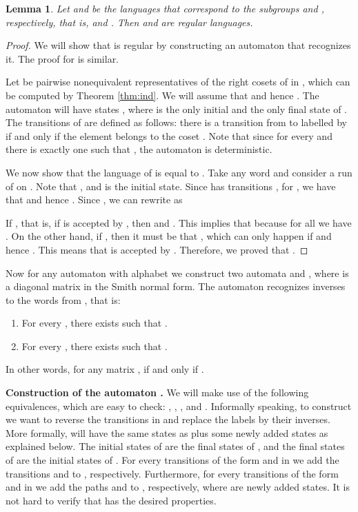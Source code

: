 \documentclass[fontsize=11pt,DIV=13,paper=letter]{scrartcl}
\newtheorem{lemma}[theorem]{Lemma}
\theoremstyle{definition}
\begin{document}
\begin{lemma}
\label{lem:regsub}
Let  and  be the languages that correspond to the subgroups  and , respectively, that is,  and . Then  and  are regular languages.
\end{lemma}

\begin{proof}
We will show that  is regular by constructing an automaton  that recognizes it. The proof for  is similar.

Let  be pairwise nonequivalent representatives of the right cosets of  in , which can be computed by Theorem \ref{thm:ind}. We will assume that  and hence . The automaton  will have  states , where  is the only initial and the only final state of . The transitions of  are defined as follows: there is a transition from  to  labelled by  if and only if the element  belongs to the coset . Note that since for every  and  there is exactly one  such that , the automaton  is deterministic.

We now show that the language of  is equal to . Take any word  and consider a run  of  on . Note that , and  is the initial state. Since  has transitions , for , we have that  and hence . Since , we can rewrite  as

If , that is, if  is accepted by , then  and . This implies that  because for all  we have . On the other hand, if , then it must be that , which can only happen if  and hence . This means that  is accepted by . Therefore, we proved that .

\end{proof}

Now for any automaton  with alphabet  we construct two automata  and , where  is a diagonal matrix in the Smith normal form. The automaton  recognizes inverses to the words from , that is:
\begin{enumerate}[(1)]
\item For every , there exists  such that .
\item For every , there exists  such that .
\end{enumerate}
In other words, for any matrix ,  if and only if .

{\bf Construction of the automaton .}
We will make use of the following equivalences, which are easy to check: , , , and . Informally speaking, to construct  we want to reverse the transitions in  and replace the labels by their inverses. More formally,  will have the same states as  plus some newly added states as explained below. The initial states of  are the final states of , and the final states of  are the initial states of . For every transitions of the form  and  in  we add the transitions  and  to , respectively. Furthermore, for every transitions of the form  and  in  we add the paths  and  to , respectively, where  are newly added states. It is not hard to verify that  has the desired properties.
\end{document}
